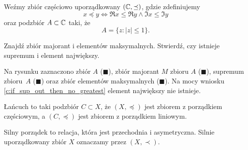 \begin{example}
    Weźmy zbiór częściowo uporządkowany $(\mathbb C, \preceq)$, gdzie zdefiniujemy
    \[ x \preceq y \iff \Re{x} \leq \Re{y} \wedge \Im{x} \leq \Im{y} \]
    oraz podzbiór $A \subset \mathbb C$ taki, że
    \[ A = \{z : |z| \leq 1\}. \]

    Znajdź zbiór majorant i elementów maksymalnych. Stwierdź, czy istnieje supremum i element największy.
\end{example}
\begin{solution}
    Na rysunku zaznaczono zbiór $A$ (\textcolor{AccColor1}{$\blacksquare$}), zbiór majorant $M$ zbioru $A$ (\textcolor{AccColor2}{$\blacksquare$}), supremum zbioru~$A$ (\textcolor{AccColor3}{$\blacksquare$}) oraz zbiór elementów maksymalnych (\textcolor{AccColor4}{$\blacksquare$}). Na mocy wniosku \ref{c:if_sup_out_then_no_greatest} element największy nie istnieje.

    \begin{center}
    \end{center}
\end{solution}

\begin{definition}
    Łańcuch to taki podzbiór $C \subset X$, że $(X, \preceq)$ jest zbiorem z porządkiem częściowym, a $(C, \preceq)$ jest zbiorem z porządkiem liniowym.
\end{definition}

\begin{definition}
    Silny porządek to relacja, która jest przechodnia i asymetryczna. Silnie uporządkowany zbiór $X$ oznaczamy przez $(X, \prec)$.
\end{definition}